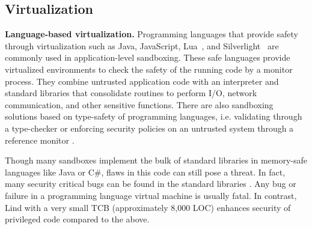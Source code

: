 
\subsection{Virtualization}

\textbf{Language-based virtualization.}
Programming languages that provide safety through virtualization such
as Java, JavaScript, Lua~\cite{Lua}, and
Silverlight~\cite{Silverlight} are commonly used in application-level
sandboxing. These safe languages provide virtualized environments to
check the safety of the running code by a monitor process. They
combine untrusted application code with an interpreter and
standard libraries that consolidate routines to perform I/O, network
communication, and other sensitive functions.
%
There are also sandboxing solutions based on type-safety of programming
languages, i.e. validating through a type-checker \cite{JS-Sandboxing}
or enforcing security policies on an untrusted system through a
reference monitor \cite{JS-Sandboxing1}. %


Though many sandboxes implement the bulk of standard libraries in
memory-safe languages like Java or C\#, flaws in this code can
still pose a threat. In fact, many security critical bugs can be found
in the standard libraries \cite{JavaBugs, Java-Lessons}.
Any bug or failure in a programming language virtual
machine is usually fatal. In contrast, Lind with a very small TCB
 (approximately
8,000 LOC) enhances security of privileged code compared to the above. 

